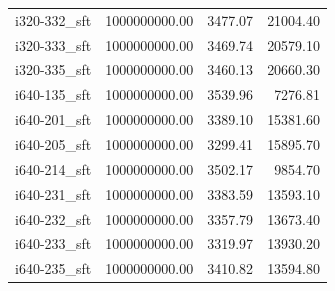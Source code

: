 \begin{tabular}{lrrr}
i320-332\_sft & 1000000000.00 &           3477.07 &    21004.40 \\
i320-333\_sft & 1000000000.00 &           3469.74 &    20579.10 \\
i320-335\_sft & 1000000000.00 &           3460.13 &    20660.30 \\
i640-135\_sft & 1000000000.00 &           3539.96 &     7276.81 \\
i640-201\_sft & 1000000000.00 &           3389.10 &    15381.60 \\
i640-205\_sft & 1000000000.00 &           3299.41 &    15895.70 \\
i640-214\_sft & 1000000000.00 &           3502.17 &     9854.70 \\
i640-231\_sft & 1000000000.00 &           3383.59 &    13593.10 \\
i640-232\_sft & 1000000000.00 &           3357.79 &    13673.40 \\
i640-233\_sft & 1000000000.00 &           3319.97 &    13930.20 \\
i640-235\_sft & 1000000000.00 &           3410.82 &    13594.80 \\
\bottomrule
\end{tabular}
